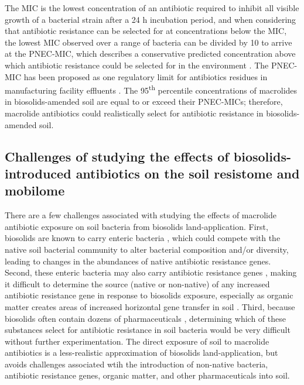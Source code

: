 The MIC is the lowest concentration of an antibiotic required to inhibit all visible growth of a bacterial strain after a 24 h incubation period, and when considering that antibiotic resistance can be selected for at concentrations below the MIC, the lowest MIC observed over a range of bacteria can be divided by 10 to arrive at the PNEC-MIC, which describes a conservative predicted concentration above which antibiotic resistance could be selected for in the environment \parencite{Tell.2019, BengtssonPalme.2016}.
The PNEC-MIC has been proposed as one regulatory limit for antibiotics residues in manufacturing facility effluents \parencite{Tell.2019}.
The 95\textsuperscript{th} percentile concentrations of macrolides in biosolids-amended soil are equal to or exceed their PNEC-MICs; therefore, macrolide antibiotics could realistically select for antibiotic resistance in biosolids-amended soil.

\subsection{Challenges of studying the effects of biosolids-introduced antibiotics on the soil resistome and mobilome}

There are a few challenges associated with studying the effects of macrolide antibiotic exposure on soil bacteria from biosolids land-application.
First, biosolids are known to carry enteric bacteria \parencite{Sidhu.2009}, which could compete with the native soil bacterial community to alter bacterial composition and/or diversity, leading to changes in the abundances of native antibiotic resistance genes.
Second, these enteric bacteria may also carry antibiotic resistance genes \parencite{Rahube.2014, Chen.2016}, making it difficult to determine the source (native or non-native) of any increased antibiotic resistance gene in response to biosolids exposure, especially as organic matter creates areas of increased horizontal gene transfer in soil \parencite{Heuer.2007}.
Third, because biosolids often contain dozens of pharmaceuticals \parencite{U.S.EnvironmentalProtectionAgency.2021}, determining which of these substances select for antibiotic resistance in soil bacteria would be very difficult without further experimentation.
The direct exposure of soil to macrolide antibiotics is a less-realistic approximation of biosolids land-application, but avoids challenges associated wtih the introduction of non-native bacteria, antibiotic resistance genes, organic matter, and other pharmaceuticals into soil.

